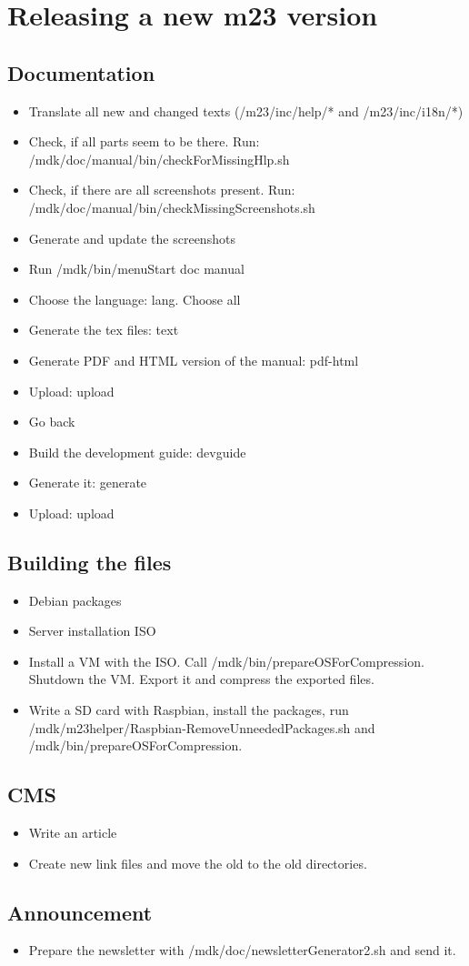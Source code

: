 \section{Releasing a new m23 version}

\subsection{Documentation}
\begin{itemize}
\item Translate all new and changed texts (/m23/inc/help/* and /m23/inc/i18n/*)
\item Check, if all parts seem to be there. Run: /mdk/doc/manual/bin/checkForMissingHlp.sh
\item Check, if there are all screenshots present. Run: /mdk/doc/manual/bin/checkMissingScreenshots.sh
\item Generate and update the screenshots
\item Run /mdk/bin/menuStart \Rightarrow doc \Rightarrow manual
\item Choose the language: \Rightarrow lang. Choose all
\item Generate the tex files: \Rightarrow text
\item Generate PDF and HTML version of the manual: \Rightarrow pdf-html
\item Upload: \Rightarrow upload
\item Go back
\item Build the development guide: \Rightarrow devguide
\item Generate it: \Rightarrow generate
\item Upload: \Rightarrow upload
\end{itemize}



\subsection{Building the files}
\begin{itemize}
\item Debian packages
\item Server installation ISO
\item Install a VM with the ISO. Call /mdk/bin/prepareOSForCompression. Shutdown the VM. Export it and compress the exported files.
\item Write a SD card with Raspbian, install the packages, run /mdk/m23helper/Raspbian-RemoveUnneededPackages.sh and /mdk/bin/prepareOSForCompression.
\end{itemize}


\subsection{CMS}
\begin{itemize}
\item Write an article
\item Create new link files and move the old to the old directories.
\end{itemize}


\subsection{Announcement}
\begin{itemize}
\item Prepare the newsletter with /mdk/doc/newsletterGenerator2.sh and send it.
\end{itemize}


